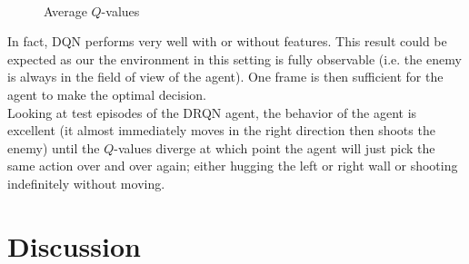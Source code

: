 \documentclass[letterpaper]{article}
\begin{document}
\begin{figure}
	\\
	\caption{Average $Q$-values}
	\label{averageq}
\end{figure}

In fact, DQN performs very well with or without features. This result could
be expected as our the environment in this setting is fully observable (i.e.
the enemy is always in the field of view of the agent). One frame is then 
sufficient for the agent to make the optimal decision.\\

Looking at test episodes of the DRQN agent, the behavior of the agent is excellent 
(it almost
immediately moves in the right direction then shoots the enemy) until the
$Q$-values diverge at which point the agent will just pick the same action
over and over again; either hugging the left or right wall or shooting
indefinitely without moving.\\

\section{Discussion}


\footnotesize


\end{document}
